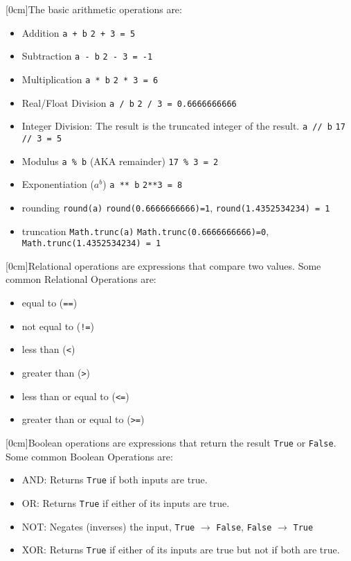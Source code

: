   [0cm]The basic arithmetic operations are:
  \begin{itemize}
    \setlength\itemsep{0em}
    \item Addition \verb|a + b|
      \subitem \verb|2 + 3 = 5|
    \item Subtraction \verb|a - b|
      \subitem \verb|2 - 3 = -1|
    \item Multiplication \verb|a * b|
      \subitem \verb|2 * 3 = 6|
    \item Real/Float Division \verb|a / b|
      \subitem \verb|2 / 3 = 0.6666666666|
    \item Integer Division: The result is the truncated integer of the result. \verb|a // b|
      \subitem \verb|17 // 3 = 5|
    \item Modulus \verb|a % b| (AKA remainder)
      \subitem \verb|17 % 3 = 2|
    \item Exponentiation ($a^b$) \verb|a ** b|
      \subitem \verb|2**3 = 8|
    \item rounding \verb|round(a)|
      \subitem \verb|round(0.6666666666)=1|, \verb|round(1.4352534234) = 1|
    \item truncation \verb|Math.trunc(a)|
      \subitem \verb|Math.trunc(0.6666666666)=0|, \verb|Math.trunc(1.4352534234) = 1|
  \end{itemize}

  [0cm]Relational operations are expressions that compare two values. Some common Relational Operations are:
  \begin{itemize}
    \setlength\itemsep{0em}
    \item equal to (\verb|==|)
    \item not equal to (\verb|!=|)
    \item less than (\verb|<|)
    \item greater than (\verb|>|)
    \item less than or equal to (\verb|<=|)
    \item greater than or equal to (\verb|>=|)
  \end{itemize}
  [0cm]Boolean operations are expressions that return the result \verb|True| or \verb|False|. Some common Boolean Operations are:
  \begin{itemize}
    \setlength\itemsep{0em}
    \item AND: Returns \verb|True| if both inputs are true.
    \item OR: Returns \verb|True| if either of its inputs are true.
    \item NOT: Negates (inverses) the input, \verb|True| $\to$ \verb|False|, \verb|False| $\to$ \verb|True|
    \item XOR: Returns \verb|True| if either of its inputs are true but not if both are true.
  \end{itemize}

